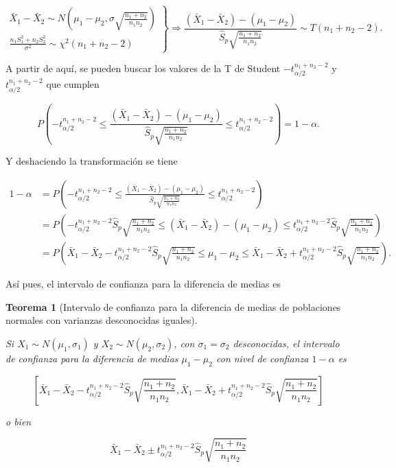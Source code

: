 \documentclass[
  spanish,
  a4paper,
]{scrreport}
\theoremstyle{plain}
\newtheorem{theorem}{Teorema}[chapter]
\theoremstyle{definition}
\theoremstyle{definition}
\theoremstyle{remark}
\begin{document}
\[
\left.
\begin{array}{l}
\bar{X}_1-\bar{X}_2\sim N\left(\mu_1-\mu_2,\sigma\sqrt{\frac{n_1+n_2}{n_1n_2}} \right)\\
\displaystyle \frac{n_1S_1^2+n_2S_2^2}{\sigma^2} \sim \chi^2(n_1+n_2-2)
\end{array}
\right\}
\Rightarrow
\frac{(\bar{X}_1-\bar{X}_2)-(\mu_1-\mu_2)}{\hat{S}_p\sqrt{\frac{n_1+n_2}{n_1n_2}}} \sim T(n_1+n_2-2).
\]

A partir de aquí, se pueden buscar los valores de la T de Student
\(-t^{n_1+n_2-2}_{\alpha/2}\) y \(t^{n_1+n_2-2}_{\alpha/2}\) que cumplen

\[
P\left(-t^{n_1+n_2-2}_{\alpha/2}\leq \frac{(\bar{X}_1-\bar{X}_2)-(\mu_1-\mu_2)}{\hat{S}_p\sqrt{\frac{n_1+n_2}{n_1n_2}}}
\leq t^{n_1+n_2-2}_{\alpha/2}\right) = 1-\alpha.
\]

Y deshaciendo la transformación se tiene

\begin{align*}
1-\alpha 
&= P\left(-t^{n_1+n_2-2}_{\alpha/2}\leq \frac{(\bar{X}_1-\bar{X}_2)-(\mu_1-\mu_2)}{\hat{S}_p\sqrt{\frac{n_1+n_2}{n_1n_2}}} \leq t^{n_1+n_2-2}_{\alpha/2}\right) \\
&= P\left(-t^{n_1+n_2-2}_{\alpha/2}\hat{S}_p\sqrt{\frac{n_1+n_2}{n_1n_2}}\leq (\bar{X}_1-\bar{X}_2)-(\mu_1-\mu_2) \leq t^{n_1+n_2-2}_{\alpha/2}\hat{S}_p\sqrt{\frac{n_1+n_2}{n_1n_2}}\right) \\
&= P\left(\bar{X}_1-\bar{X}_2 - t^{n_1+n_2-2}_{\alpha/2}\hat{S}_p\sqrt{\frac{n_1+n_2}{n_1n_2}}\leq \mu_1-\mu_2 \leq \bar{X}_1-\bar{X}_2 + t^{n_1+n_2-2}_{\alpha/2}\hat{S}_p\sqrt{\frac{n_1+n_2}{n_1n_2}}\right).
\end{align*}

Así pues, el intervalo de confianza para la diferencia de medias es

\begin{theorem}[Intervalo de confianza para la diferencia de medias de
poblaciones normales con varianzas desconocidas
iguales]\protect\hypertarget{thm-intervalo-confianza-diferencia-medias-normales-varianzas-desconocidas-iguales}{}\label{thm-intervalo-confianza-diferencia-medias-normales-varianzas-desconocidas-iguales}

Si \(X_1\sim N(\mu_1,\sigma_1)\) y \(X_2\sim N(\mu_2,\sigma_2)\), con
\(\sigma_1 = \sigma_2\) desconocidas, el \emph{intervalo de confianza
para la diferencia de medias} \(\mu_1-\mu_2\) con nivel de confianza
\(1-\alpha\) es

\[
\left[\bar{X}_1-\bar{X}_2-t^{n_1+n_2-2}_{\alpha/2}\hat{S}_p\sqrt{\frac{n_1+n_2}{n_1n_2}},\bar{X}_1-\bar{X}_2+t^{n_1+n_2-2}_{\alpha/2}\hat{S}_p\sqrt{\frac{n_1+n_2}{n_1n_2}}\right]
\]

o bien

\[
\bar{X}_1-\bar{X}_2\pm t^{n_1+n_2-2}_{\alpha/2}\hat{S}_p\sqrt{\frac{n_1+n_2}{n_1n_2}}
\]

\end{theorem}
\end{document}
